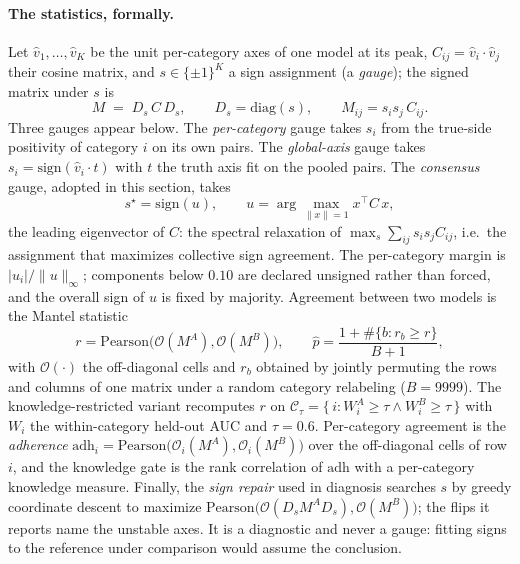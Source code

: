 \documentclass[11pt]{article}
\begin{document}
\paragraph{The statistics, formally.} Let $\hat v_1, \dots, \hat v_K$ be
the unit per-category axes of one model at its peak, $C_{ij} = \hat v_i
\cdot \hat v_j$ their cosine matrix, and $s \in \{\pm 1\}^K$ a sign
assignment (a \emph{gauge}); the signed matrix under $s$ is
\begin{equation}
M \;=\; D_s\, C\, D_s, \qquad D_s = \mathrm{diag}(s),
\qquad M_{ij} = s_i s_j\, C_{ij}.
\label{b:eq:gauge}
\end{equation}
Three gauges appear below. The \emph{per-category} gauge takes $s_i$ from
the true-side positivity of category $i$ on its own pairs. The
\emph{global-axis} gauge takes $s_i = \mathrm{sign}(\hat v_i \cdot t)$
with $t$ the truth axis fit on the pooled pairs. The \emph{consensus}
gauge, adopted in this section, takes
\begin{equation}
s^{\star} = \mathrm{sign}(u), \qquad
u = \arg\max_{\lVert x \rVert = 1} x^{\top} C\, x,
\label{b:eq:eigen}
\end{equation}
the leading eigenvector of $C$: the spectral relaxation of
$\max_{s} \sum_{ij} s_i s_j C_{ij}$, i.e.\ the assignment that maximizes
collective sign agreement. The per-category margin is
$|u_i| / \lVert u \rVert_{\infty}$; components below $0.10$ are declared
unsigned rather than forced, and the overall sign of $u$ is fixed by
majority. Agreement between two models is the Mantel statistic
\begin{equation}
r = \mathrm{Pearson}\big(\mathcal{O}(M^{A}), \mathcal{O}(M^{B})\big),
\qquad
\hat p = \frac{1 + \#\{b : r_b \geq r\}}{B + 1},
\label{b:eq:mantel}
\end{equation}
with $\mathcal{O}(\cdot)$ the off-diagonal cells and $r_b$ obtained by
jointly permuting the rows and columns of one matrix under a random
category relabeling ($B = 9999$). The knowledge-restricted variant
recomputes $r$ on $\mathcal{C}_{\tau} = \{\, i : W_i^{A} \geq \tau \wedge
W_i^{B} \geq \tau \,\}$ with $W_i$ the within-category held-out AUC and
$\tau = 0.6$. Per-category agreement is the \emph{adherence}
$\mathrm{adh}_i = \mathrm{Pearson}\big(\mathcal{O}_i(M^{A}),
\mathcal{O}_i(M^{B})\big)$ over the off-diagonal cells of row $i$, and the
knowledge gate is the rank correlation of $\mathrm{adh}$ with a
per-category knowledge measure. Finally, the \emph{sign repair} used in
diagnosis searches $s$ by greedy coordinate descent to maximize
$\mathrm{Pearson}\big(\mathcal{O}(D_s M^{A} D_s),
\mathcal{O}(M^{B})\big)$; the flips it reports name the unstable axes. It
is a diagnostic and never a gauge: fitting signs to the reference under
comparison would assume the conclusion.
\end{document}
